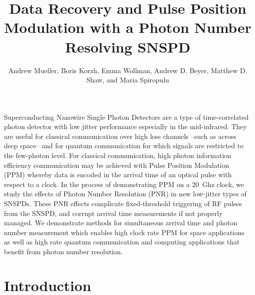 \documentclass{optica-article}
\begin{document}
\title{Data Recovery and Pulse Position Modulation with a Photon Number Resolving SNSPD}

\author{Andrew Mueller, Boris Korzh, Emma Wollman, Andrew D. Beyer, Matthew D. Shaw, and Maria Spiropulu}

\address{Applied Physics, California Institute of Technology, 1200 E California Blvd., Pasadena, CA, 91125, USA \\
Jet Propulsion Laboratory, California Institute of Technology, 4800 Oak Grove Dr., Pasadena, CA, 91109, USA \\
Division of Physics, Mathematics and Astronomy, California Institute of Technology, 1200 E California Blvd., Pasadena, CA 91125, USA }



\begin{abstract*} 
Superconducting Nanowire Single Photon Detectors are a type of time-correlated photon detector with low jitter performance especially in the mid-infrared. They are useful for classical communication over high loss channels --such as across deep space-- and for quantum communication for which signals are restricted to the few-photon level. For classical communication, high photon information efficiency communication may be achieved with Pulse Position Modulation (PPM) whereby data is encoded in the arrival time of an optical pulse with respect to a clock. In the process of demonstrating PPM on a 20~Ghz clock, we study the effects of Photon Number Resolution (PNR) in new low-jitter types of SNSPDs. These PNR effects complicate fixed-threshold triggering of RF pulses from the SNSPD, and corrupt arrival time measurements if not properly managed. We demonstrate methods for simultaneous arrival time and photon number measurement which enables high clock rate PPM for space applications as well as high rate quantum communication and computing applications that benefit from photon number resolution.
\end{abstract*}

\hypertarget{introduction}{%
\section{Introduction}\label{introduction}}
\end{document}
